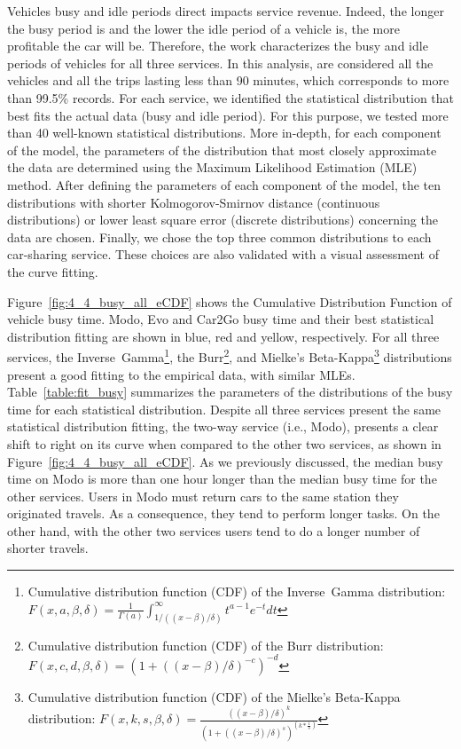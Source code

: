 Vehicles busy and idle periods direct impacts service revenue. Indeed, the longer the busy period is and the lower the idle period of a vehicle is, the more profitable the car will be. Therefore, the work characterizes the busy and idle periods of vehicles for all three services. In this analysis, are considered all the vehicles and all the trips lasting less than 90 minutes, which corresponds to more than 99.5\% records. 
For each service, we identified the statistical distribution that best fits the actual data (busy and idle period). For this purpose, we tested more than 40 well-known statistical distributions. More in-depth, for each component of the model, the parameters of the distribution that most closely approximate the data are determined using the Maximum Likelihood Estimation (MLE) method. After defining the parameters of each component of the model, the ten distributions with shorter Kolmogorov-Smirnov distance (continuous distributions) or lower least square error (discrete distributions) concerning the data are chosen. Finally, we chose the top three common distributions to each car-sharing service. These choices are also validated with a visual assessment of the curve fitting.

Figure~\ref{fig:4_4_busy_all_eCDF} shows the Cumulative Distribution Function of vehicle busy time.  Modo, Evo and Car2Go busy time and their best statistical distribution fitting are shown in blue, red and yellow, respectively. For all three services, the Inverse~Gamma\footnote{Cumulative distribution function (CDF) of the Inverse~Gamma distribution: $F(x, a, \beta, \delta) = \frac{1}{\Gamma(a)}\int_{1/\left((x-\beta)/\delta\right)}^{\infty}t^{a-1}e^{-t}dt$}, 
the Burr\footnote{Cumulative distribution function (CDF) of the Burr distribution: $F(x,c,d,\beta,\delta)=\left(1 + \left((x-\beta)/\delta\right)^{-c}\right)^{-d}$}, 
and Mielke's Beta-Kappa\footnote{Cumulative distribution function (CDF) of the Mielke's Beta-Kappa distribution: $F(x,k,s,\beta,\delta) = \frac{\left((x-\beta)/\delta\right)^{k}}{(1+\left((x-\beta)/\delta\right)^{s})^{(k*\frac{1}{s})}}$} 
distributions present a  good fitting to the empirical data, with similar MLEs.  
Table~\ref{table:fit_busy} summarizes the parameters of the distributions of the busy time for each statistical distribution.
Despite all three services present the same statistical distribution fitting, 
the two-way service (i.e., Modo), presents a clear shift to right on its curve when compared to the other two services, as shown in Figure~\ref{fig:4_4_busy_all_eCDF}. As we previously discussed, the median busy time on Modo is more than one hour longer than the median busy time for the other services. 
Users in Modo must return cars to the same station they originated travels. As a consequence, they tend to perform longer tasks. On the other hand, with the other two services users tend to do a longer number of shorter travels.

